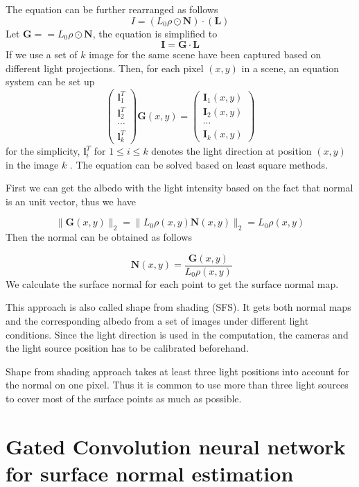 The equation can be further rearranged as follows
\[ I =(L_0\rho \odot \textbf{N}) \cdot  ( \textbf{L}) \]
Let $ \textbf{G} = =L_0\rho \odot \textbf{N} $, the equation is simplified to 
\[\textbf{I} = \textbf{G} \cdot \textbf{L}\]
If we use a set of $ k $ image for the same scene have been captured based on different light projections. Then, for each pixel $ (x,y) $ in a scene, an equation system can be set up 
\[ 
\begin{pmatrix}
	\textbf{l}_1^T \\
	\textbf{l}_2^T \\
	\cdots \\
	\textbf{l}_k^T
\end{pmatrix} \textbf{G}(x,y) = 
\begin{pmatrix}
	\textbf{I}_1(x,y) \\
	\textbf{I}_2(x,y) \\
	\cdots \\
	\textbf{I}_k(x,y)
\end{pmatrix}
\]
for the simplicity, $ \textbf{l}_i^T $ for $ 1\le i \le k $ denotes the light direction at position $ (x,y) $ in the image $ k $ . The equation can be solved based on least square methods. 

First we can get the albedo with the light intensity based on the fact that normal is an unit vector, thus we have 

\[ \|\textbf{G}(x,y)\|_2 = \|L_0\rho(x,y)\textbf{N}(x,y)\|_2 = L_0\rho(x,y) \]
Then the normal can be obtained as follows

\[ \textbf{ N}(x,y) = \frac{\textbf{G}(x,y)}{L_0\rho(x,y)}\]
We calculate the surface normal for each point  to get the surface normal map. 

This approach is also called shape from shading (SFS)\cite{SFS}. It gets both normal maps and the corresponding albedo from a set of images under different light conditions. Since the light direction is used in the computation, the cameras and the light source position has to be calibrated beforehand. 

Shape from shading approach takes at least three light positions into account for the normal on one pixel. Thus it is common to use more than three light sources to cover most of the surface points as much as possible. 

\newpage 
\section{Gated Convolution neural network for surface normal estimation}
\label{sec:gcnn}


